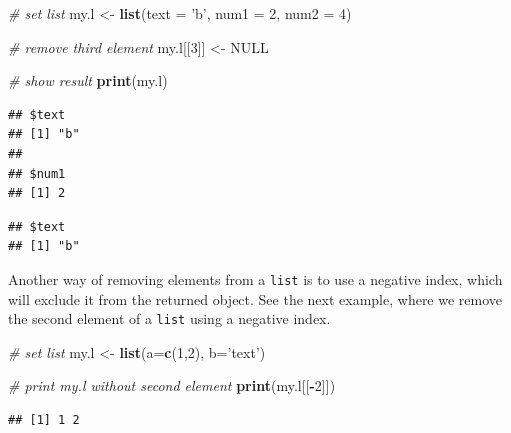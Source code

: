 \documentclass[11pt,]{book}
\newenvironment{Shaded}{\begin{snugshade}}{\end{snugshade}}
\newcommand{\KeywordTok}[1]{\textcolor[rgb]{0.27,0.27,0.27}{\textbf{#1}}}
\newcommand{\DataTypeTok}[1]{\textcolor[rgb]{0.27,0.27,0.27}{#1}}
\newcommand{\DecValTok}[1]{\textcolor[rgb]{0.06,0.06,0.06}{#1}}
\newcommand{\StringTok}[1]{\textcolor[rgb]{0.5,0.5,0.5}{#1}}
\newcommand{\CommentTok}[1]{\textcolor[rgb]{0.56,0.35,0.01}{\textit{#1}}}
\newcommand{\OtherTok}[1]{\textcolor[rgb]{0.56,0.35,0.01}{#1}}
\newcommand{\OperatorTok}[1]{\textcolor[rgb]{0.81,0.36,0.00}{\textbf{#1}}}
\newcommand{\NormalTok}[1]{#1}
\begin{document}
\begin{Shaded}
\begin{Highlighting}[]
\CommentTok{# set list}
\NormalTok{my.l <-}\StringTok{ }\KeywordTok{list}\NormalTok{(}\DataTypeTok{text =} \StringTok{'b'}\NormalTok{, }\DataTypeTok{num1 =} \DecValTok{2}\NormalTok{, }\DataTypeTok{num2 =} \DecValTok{4}\NormalTok{)}

\CommentTok{# remove third element}
\NormalTok{my.l[[}\DecValTok{3}\NormalTok{]] <-}\StringTok{ }\OtherTok{NULL}

\CommentTok{# show result}
\KeywordTok{print}\NormalTok{(my.l)}
\end{Highlighting}
\end{Shaded}

\begin{verbatim}
## $text
## [1] "b"
## 
## $num1
## [1] 2
\end{verbatim}

\begin{Shaded}
\end{Shaded}

\begin{verbatim}
## $text
## [1] "b"
\end{verbatim}

Another way of removing elements from a \texttt{list} is to use a
negative index, which will exclude it from the returned object. See the
next example, where we remove the second element of a \texttt{list}
using a negative index.

\begin{Shaded}
\begin{Highlighting}[]
\CommentTok{# set list}
\NormalTok{my.l <-}\StringTok{ }\KeywordTok{list}\NormalTok{(}\DataTypeTok{a=}\KeywordTok{c}\NormalTok{(}\DecValTok{1}\NormalTok{,}\DecValTok{2}\NormalTok{), }\DataTypeTok{b=}\StringTok{'text'}\NormalTok{)}

\CommentTok{# print my.l without second element}
\KeywordTok{print}\NormalTok{(my.l[[}\OperatorTok{-}\DecValTok{2}\NormalTok{]])}
\end{Highlighting}
\end{Shaded}

\begin{verbatim}
## [1] 1 2
\end{verbatim}
\end{document}
